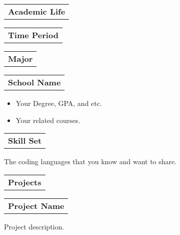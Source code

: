\documentclass{article}
\begin{document}
    \skip
    
    \begin{tabular}[c]{l}
      \textbf{Academic Life} \end{tabular} 
      \hline \hline \vspace{2pt}
      \begin{tabular}[c]{l} \textbf{Time Period} \end{tabular} \hfill
      \begin{tabular}[c]{c} \textbf{Major} \end{tabular} \hfill
      \begin{tabular}[c]{r} \textbf{School Name} 
    \end{tabular}
    
   \begin{description}[style=nextline, listparindent=\parindent, parsep=0pt,                     \vspace{-1pt}]
    \begin{itemize}[, leftmargin=.01in]
        \item Your Degree, GPA, and etc.
        \item Your related courses.
    \end{itemize}
   \end{description}
   
   \skip

    \begin{tabular}[c]{l}
      \textbf{Skill Set} \end{tabular} 
      \hline \hline \vspace{2pt}
    
   \begin{description}[style=nextline, listparindent=\parindent, parsep=0pt,                     \vspace{1pt}]
    \begin{itemize}[, leftmargin=.01in]
        The coding languages that you know and want to share.
    \end{itemize}
   \end{description} 
   
   \skip
    \begin{tabular}[c]{l}
      \textbf{Projects} \end{tabular} 
      \hline \hline \vspace{2pt}
    
   \begin{tabular}[c]{l} \textbf{Project Name} \end{tabular} 
    
   \begin{description}[style=nextline, listparindent=\parindent, parsep=0pt,                     \vspace{-1pt}]
    \begin{itemize}[, leftmargin=.01in]
        Project description.
    \end{itemize}
   \end{description} 
   
\end{document}
